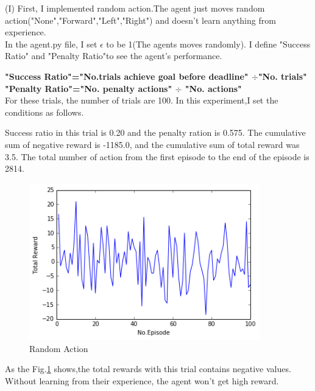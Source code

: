 \documentclass[a4paper,11pt]{article}
\begin{document}
(I) First, I implemented random action.The agent just moves random action("None","Forward","Left","Right") and doesn't learn anything from experience.
\\
In the agent.py file, I set $\epsilon$ to be 1(The agents moves randomly).
I define "Success Ratio" and "Penalty Ratio"to see the agent's performance.


{\bf "Success Ratio"="No.trials achieve goal before deadline" $\div$"No. trials"}\\

{\bf "Penalty Ratio"="No. penalty actions" $\div$ "No. actions"}\\

For these trials, the number of trials are 100.
In this experiment,I set the conditions as follows.


Success ratio in this trial is 0.20 and the penalty ration is 0.575.
The cumulative sum of negative reward is -1185.0, and the cumulative sum of total reward was 3.5.
The total number of action from the first episode to the end of the episode is 2814.


        


\begin{figure}[H]
\begin{center}
\includegraphics[width=100mm]{graph/random.jpg}
\end{center}
\caption{Random Action}
\label{fig:one}
\end{figure}

As the Fig.\ref{fig:one} shows,the total rewards with this trial contains negative values.
Without learning from their experience, the agent won't get high reward.
\\

\end{document}
